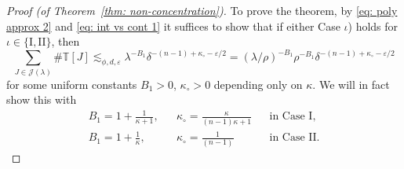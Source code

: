 \documentclass[reqno]{amsart}
\numberwithin{equation}{section}
\newcommand{\cJ}{\mathcal{J}}
\theoremstyle{plain}
\theoremstyle{definition}
\newcommand{\tI}{\mathrm{I}}
\newcommand{\tII}{\mathrm{II}}
\begin{document}
\begin{proof}[Proof (of Theorem~\ref{thm: non-concentration})]
\noindent To prove the theorem, by \eqref{eq: poly approx 2} and \eqref{eq: int vs cont 1} it suffices to show that if either Case $\iota$) holds for $\iota \in \{\tI, \tII\}$, then
\begin{equation}\label{eq: desired}    \sum_{J\in\cJ(\lambda)} \#\mathbb{T}[J]\lesssim_{\phi,d,\varepsilon} \lambda^{-B_1}\delta^{-(n-1)+\kappa_\circ -\varepsilon/2}= (\lambda/\rho)^{-B_1}\rho^{-B_1}\delta^{-(n-1)+\kappa_\circ -\varepsilon/2}
\end{equation}
for some uniform constants $B_1 > 0$, $\kappa_\circ>0$ depending only on $\kappa$. We will in fact show this with
\begin{equation*}
    \begin{array}{lclcl}
      B_1 = 1+\frac{1}{\kappa+1},   & & \kappa_\circ = \frac{\kappa}{(n-1)\kappa+1} & & \text{in Case I,} \\[4pt]
      B_1 =  1+\frac{1}{\kappa},& &  \kappa_\circ= \frac{1}{(n-1)} & &\text{in Case II}.
    \end{array}
\end{equation*}


\end{proof}
\end{document}

